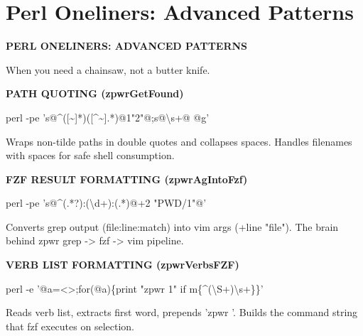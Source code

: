\documentclass[11pt,a4paper,twoside]{book}
\begin{document}
\vspace{16pt}

\section{Perl Oneliners: Advanced Patterns}


\vspace{10pt}
{\large\bfseries\color{neoncyan} PERL ONELINERS: ADVANCED PATTERNS}\vspace{6pt}

When you need a chainsaw, not a butter knife.


\vspace{12pt}
{\bfseries\color{neonyellow} \textbf{PATH} QUOTING (zpwrGetFound)}\vspace{4pt}

\begin{codebox}
\color{neongreen}perl -pe 's@\textasciicircum{}([\textasciitilde{}]*)([\textasciicircum{}\textasciitilde{}].*)@1"2"@;s@\textbackslash{}s+@ @g'\\
\end{codebox}

Wraps non-tilde paths in double quotes and collapses spaces. Handles filenames with spaces for safe shell consumption.


\vspace{12pt}
{\bfseries\color{neonyellow} FZF RESULT FORMATTING (zpwrAgIntoFzf)}\vspace{4pt}

\begin{codebox}
\color{neongreen}perl -pe 's@\textasciicircum{}(.*?):(\textbackslash{}d+):(.*)@+2 "PWD/1"@'\\
\end{codebox}

Converts grep output (file:line:match) into vim args (+line "file"). The brain behind zpwr grep -> fzf -> vim pipeline.


\vspace{12pt}
{\bfseries\color{neonyellow} VERB LIST FORMATTING (zpwrVerbsFZF)}\vspace{4pt}

\begin{codebox}
\color{neongreen}perl -e '@a=<>;for(@a)\{print "zpwr 1" if m\{\textasciicircum{}(\textbackslash{}S+)\textbackslash{}s+\}\}'\\
\end{codebox}

Reads verb list, extracts first word, prepends 'zpwr '. Builds the command string that fzf executes on selection.
\end{document}

